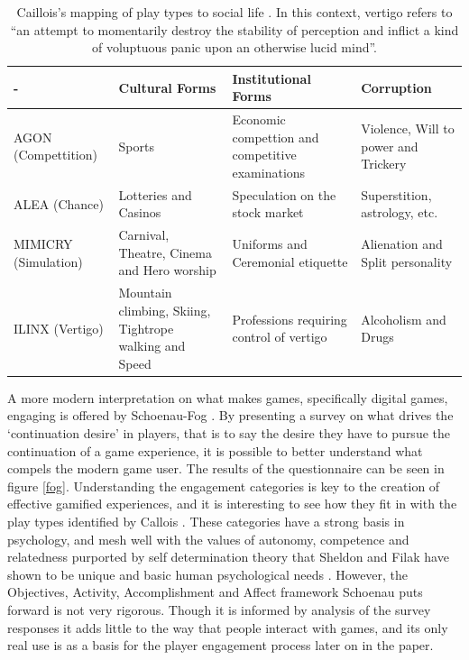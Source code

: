 \documentclass[12pt,a4paper,twoside]{report}
\begin{document}
\begin{table}
	\begin{center}
	\begin{tabular}{|p{2.0cm}|p{4.2cm}|p{4.2cm}|p{4.2cm}|}
		\hline - & Cultural Forms & Institutional Forms & Corruption \\ 
		\hline AGON (Compettition) & Sports & Economic compettion and competitive examinations & Violence, Will to power and Trickery \\ 
		\hline ALEA (Chance) & Lotteries and Casinos & Speculation on the stock market & Superstition, astrology, etc. \\ 
		\hline MIMICRY (Simulation) & Carnival, Theatre, Cinema and Hero worship & Uniforms and Ceremonial etiquette & Alienation and Split personality \\ 
		\hline ILINX (Vertigo) & Mountain climbing, Skiing, Tightrope walking and Speed & Professions requiring control of vertigo & Alcoholism and Drugs \\ 
		\hline 
	\end{tabular}
	\end{center}
	\caption{Caillois's mapping of play types to social life \cite{caillois1961man}. In this context, vertigo refers to ``an attempt to momentarily destroy the stability of perception and inflict a kind of voluptuous panic upon an otherwise lucid mind''.}
	\label{table:corruption}
\end{table}

A more modern interpretation on what makes games, specifically digital games, engaging is offered by Schoenau-Fog \cite{schoenau2011player}. By presenting a survey on what drives the `continuation desire' in players, that is to say the desire they have to pursue the continuation of a game experience, it is possible to better understand what compels the modern game user. The results of the questionnaire can be seen in figure \ref{fog}. Understanding the engagement categories is key to the creation of effective gamified experiences, and it is interesting to see how they fit in with the play types identified by Callois \cite{caillois1961man}. These categories have a strong basis in psychology, and mesh well with the values of autonomy, competence and relatedness purported by self determination theory that Sheldon and Filak have shown to be unique and basic human psychological needs \cite{sheldon2008manipulating}. However, the Objectives, Activity, Accomplishment and Affect framework Schoenau puts forward is not very rigorous. Though it is informed by analysis of the survey responses it adds little to the way that people interact with games, and its only real use is as a basis for the player engagement process later on in the paper.
\end{document}
